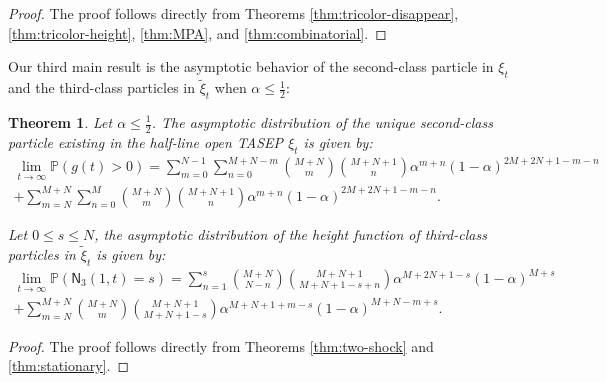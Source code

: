 \documentclass[12pt,a4paper]{amsart}
\newtheorem{theorem}{Theorem} %
\theoremstyle{remark}
\numberwithin{equation}{section} \numberwithin{theorem}{section}
\begin{document}
\begin{proof}
The proof follows directly from Theorems \ref{thm:tricolor-disappear}, \ref{thm:tricolor-height}, \ref{thm:MPA}, and \ref{thm:combinatorial}.
\end{proof}


Our third main result is the asymptotic behavior of the second-class particle in $\xi_t$ and the third-class particles in $\tilde{\xi}_{t}$ when $ \alpha \leq \frac12$:
\begin{theorem}
\label{thm:two-shocks-stationary-4.1}
Let $ \alpha \leq \frac12$. The asymptotic distribution of the unique second-class particle existing in the half-line open TASEP $\xi_t$ is given by:
\begin{multline}
\label{eq:two-shocks-exist-1}
\lim_{t\to\infty}\mathbb{P}(g(t)>0)=\sum_{m=0}^{N-1}\sum_{n=0}^{M+N-m}\binom{M+N}{m}\binom{M+N+1}{n}\alpha^{m+n}(1-\alpha)^{2M+2N+1-m-n}\\
+\sum_{m=N}^{M+N}\sum_{n=0}^{M}\binom{M+N}{m}\binom{M+N+1}{n}\alpha^{m+n}(1-\alpha)^{2M+2N+1-m-n}.
\end{multline}

Let $0 \leq s \leq N$, the asymptotic distribution of the height function of third-class particles in $\tilde{\xi}_t$ is given by:
\begin{multline}
\label{eq:two-shocks-height-1}
\lim_{t\to\infty}\mathbb{P}(\mathsf{N}_{3} (1,t)=s)=\sum_{n=1}^{s}\binom{M+N}{N-n}\binom{M+N+1}{M+N+1-s+n}\alpha^{M+2N+1-s}(1-\alpha)^{M+s}\\
+\sum_{m=N}^{M+N}\binom{M+N}{m}\binom{M+N+1}{M+N+1-s}\alpha^{M+N+1+m-s}(1-\alpha)^{M+N-m+s}.
\end{multline}
\end{theorem}

\begin{proof}
The proof follows directly from Theorems \ref{thm:two-shock} and \ref{thm:stationary}.
\end{proof}
\end{document}
